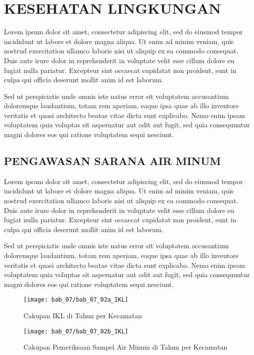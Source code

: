 \chapter{KESEHATAN LINGKUNGAN}
Lorem ipsum dolor sit amet, consectetur adipiscing elit, sed do eiusmod tempor incididunt ut labore et dolore magna aliqua. Ut enim ad minim veniam, quis nostrud exercitation ullamco laboris nisi ut aliquip ex ea commodo consequat. Duis aute irure dolor in reprehenderit in voluptate velit esse cillum dolore eu fugiat nulla pariatur. Excepteur sint occaecat cupidatat non proident, sunt in culpa qui officia deserunt mollit anim id est laborum.

Sed ut perspiciatis unde omnis iste natus error sit voluptatem accusantium doloremque laudantium, totam rem aperiam, eaque ipsa quae ab illo inventore veritatis et quasi architecto beatae vitae dicta sunt explicabo. Nemo enim ipsam voluptatem quia voluptas sit aspernatur aut odit aut fugit, sed quia consequuntur magni dolores eos qui ratione voluptatem sequi nesciunt.

\section{PENGAWASAN SARANA AIR MINUM}
Lorem ipsum dolor sit amet, consectetur adipiscing elit, sed do eiusmod tempor incididunt ut labore et dolore magna aliqua. Ut enim ad minim veniam, quis nostrud exercitation ullamco laboris nisi ut aliquip ex ea commodo consequat. Duis aute irure dolor in reprehenderit in voluptate velit esse cillum dolore eu fugiat nulla pariatur. Excepteur sint occaecat cupidatat non proident, sunt in culpa qui officia deserunt mollit anim id est laborum.

Sed ut perspiciatis unde omnis iste natus error sit voluptatem accusantium doloremque laudantium, totam rem aperiam, eaque ipsa quae ab illo inventore veritatis et quasi architecto beatae vitae dicta sunt explicabo. Nemo enim ipsam voluptatem quia voluptas sit aspernatur aut odit aut fugit, sed quia consequuntur magni dolores eos qui ratione voluptatem sequi nesciunt.

\begin{figure}[H]
    \centering
    \texttt{[image: bab\_07/bab\_07\_02a\_IKL]}
    \caption{Cakupan IKL di \namaKabupaten Tahun \tP per Kecamatan}
    \label{fig:Cakupan-IKL-a}
\end{figure}

\begin{figure}[H]
    \centering
    \texttt{[image: bab\_07/bab\_07\_02b\_IKL]}
    \caption{Cakupan Pemeriksaan Sampel Air Minum di \namaKabupaten Tahun \tP per Kecamatan}
    \label{fig:Cakupan-IKL-b}
\end{figure}

